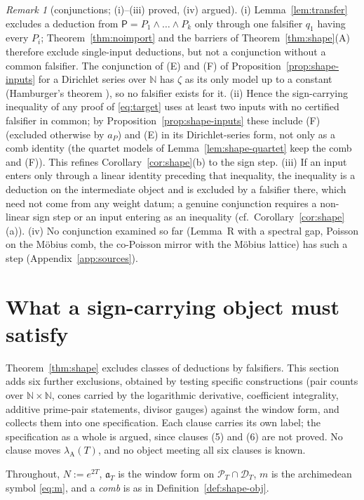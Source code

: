 \documentclass[11pt]{amsart}
\theoremstyle{definition}
\theoremstyle{remark}
\newtheorem{remark}[theorem]{Remark}
\newcommand{\N}{\mathbb N}
\newcommand{\PT}{\mathcal P_T}
\newcommand{\lamA}{\lambda_{\mathrm A}(T)}
\begin{document}
\begin{remark}[conjunctions; (i)--(iii) proved, (iv) argued]\label{rem:conjunctions}
(i) Lemma~\ref{lem:transfer} excludes a deduction from $\mathsf P=P_1\wedge\dots\wedge P_k$ only through one falsifier $q_1$ having
every $P_i$; Theorem~\ref{thm:noimport} and the barriers of Theorem~\ref{thm:shape}(A) therefore exclude single-input deductions, but not a
conjunction without a common falsifier. The conjunction of (E) and (F) of Proposition~\ref{prop:shape-inputs} for a Dirichlet series over
$\N$ has $\zeta$ as its only model up to a constant (Hamburger's theorem \cite{Hamburger1921}), so no falsifier exists for it.
(ii) Hence the sign-carrying inequality of any proof of \eqref{eq:target} uses at least two inputs with no certified falsifier in common;
by Proposition~\ref{prop:shape-inputs} these include (F) (excluded otherwise by $a_P$) and (E) in its Dirichlet-series form, not only as a
comb identity (the quartet models of Lemma~\ref{lem:shape-quartet} keep the comb and (F)). This refines Corollary~\ref{cor:shape}(b) to the
sign step. (iii) If an input enters only through a linear identity preceding that inequality, the inequality is a deduction on the
intermediate object and is excluded by a falsifier there, which need not come from any weight datum; a genuine conjunction requires a
non-linear sign step or an input entering as an inequality (cf.\ Corollary~\ref{cor:shape}(a)). (iv) No conjunction examined so far (Lemma~R with a spectral gap, Poisson on the M\"obius comb, the co-Poisson mirror with the M\"obius lattice) has
such a step (Appendix~\ref{app:sources}).
\end{remark}

\section{What a sign-carrying object must satisfy}\label{sec:spec}


Theorem~\ref{thm:shape} excludes classes of deductions by falsifiers. This section adds six further exclusions, obtained by testing
specific constructions (pair counts over $\N\times\N$, cones carried by the logarithmic derivative, coefficient integrality, additive
prime-pair statements, divisor gauges) against the window form, and collects them into one specification. Each clause carries its own
label; the specification as a whole is argued, since clauses (5) and (6) are not proved. No clause moves $\lamA$, and no object meeting
all six clauses is known.

Throughout, $N:=e^{2T}$, $\mathfrak a_T$ is the window form on $\PT\cap\mathcal D_T$, $m$ is the archimedean symbol \eqref{eq:m}, and a
\emph{comb} is as in Definition~\ref{def:shape-obj}.
\end{document}
